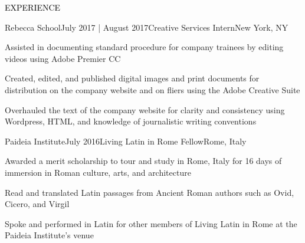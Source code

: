 \documentclass{resume} %
\renewenvironment{rSection}[1]{
  \sectionskip
  \textcolor{Black}{\MakeUppercase{#1}}
  \sectionlineskip
  \begin{list}{}{
      \setlength{\leftmargin}{1.5em}
    }
  \item[]
  }{
  \end{list}
}
\begin{document}
\begin{rSection}{Experience}
  \begin{rSubsection}{Rebecca School}{July 2017 | August 2017}{Creative Services Intern}{New York, NY}
  \item Assisted in documenting standard procedure for company trainees by
    editing videos using Adobe Premier
    CC %
    \item Created, edited, and published digital images and print documents for distribution on the company website and on fliers using the Adobe Creative Suite
    \item Overhauled the text of the company website for clarity and consistency using Wordpress, HTML, and knowledge of journalistic writing conventions
  \end{rSubsection}

  \begin{rSubsection}{Paideia Institute}{July 2016}{Living Latin in Rome Fellow}{Rome, Italy}
\item Awarded a merit scholarship to tour and study in Rome, Italy for 16 days of immersion in Roman culture, arts, and architecture
    \item Read and translated Latin passages from Ancient Roman authors such as Ovid, Cicero, and Virgil
    \item Spoke and performed in Latin for other members of Living Latin in Rome at the Paideia Institute's venue
  \end{rSubsection}


\end{rSection}
\end{document}

